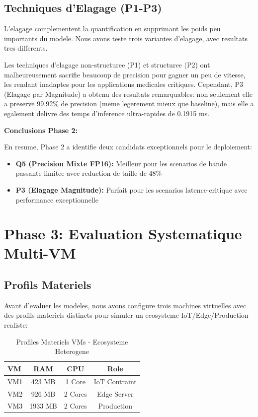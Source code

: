 \documentclass[12pt,a4paper]{report}
\begin{document}
\section{Techniques d'Elagage (P1-P3)}

L'elagage complementent la quantification en supprimant les poids peu importants du modele. Nous avons teste trois variantes d'elagage, avec resultats tres differents.

Les techniques d'elagage non-structuree (P1) et structuree (P2) ont malheureusement sacrifie beaucoup de precision pour gagner un peu de vitesse, les rendant inadaptes pour les applications medicales critiques. Cependant, P3 (Elagage par Magnitude) a obtenu des resultats remarquables: non seulement elle a preserve 99.92\% de precision (meme legerement mieux que baseline), mais elle a egalement delivre des temps d'inference ultra-rapides de 0.1915 ms.

\textbf{Conclusions Phase 2:}

En resume, Phase 2 a identifie deux candidats exceptionnels pour le deploiement:
\begin{itemize}
    \item \textbf{Q5 (Precision Mixte FP16):} Meilleur pour les scenarios de bande passante limitee avec reduction de taille de 48\%
    \item \textbf{P3 (Elagage Magnitude):} Parfait pour les scenarios latence-critique avec performance exceptionnelle
\end{itemize}

\chapter{Phase 3: Evaluation Systematique Multi-VM}

\section{Profils Materiels}

Avant d'evaluer les modeles, nous avons configure trois machines virtuelles avec des profils materiels distincts pour simuler un ecosysteme IoT/Edge/Production realiste:

\begin{table}[H]
\centering
\begin{tabular}{|l|c|c|c|}
\hline
\textbf{VM} & \textbf{RAM} & \textbf{CPU} & \textbf{Role} \\
\hline
VM1 & 423 MB & 1 Core & IoT Contraint \\
VM2 & 926 MB & 2 Cores & Edge Server \\
VM3 & 1933 MB & 2 Cores & Production \\
\hline
\end{tabular}
\caption{Profiles Materiels VMs - Ecosysteme Heterogene}
\end{table}
\end{document}
